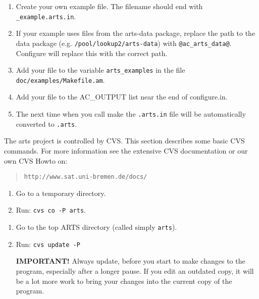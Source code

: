 \begin{enumerate}
\item Create your own example file. The filename should end with
  \verb|_example.arts.in|.
\item If your example uses files from the arts-data package, replace
  the path to the data package (e.g. \verb|/pool/lookup2/arts-data|)
  with \verb|@ac_arts_data@|. Configure will replace this with the
  correct path.
\item Add your file to the variable \verb|arts_examples| in the file
  \verb|doc/examples/Makefile.am|.
\item Add your file to the AC\_OUTPUT list near the end of configure.in.
\item The next time when you call make the \verb|.arts.in| file will
  be automatically converted to \verb|.arts|.
\end{enumerate}


 \label{sec:development:cvs}

The arts project is controlled by CVS. This section describes some
basic CVS commands. For more information see the extensive CVS
documentation or our own CVS Howto on:
\begin{quote}
  \verb|http://www.sat.uni-bremen.de/docs/|
\end{quote}




\begin{enumerate}
\item Go to a temporary directory.
\item Run: \verb|cvs co -P arts|.
\end{enumerate}


\begin{enumerate}
\item Go to the top ARTS directory (called simply \verb|arts|).
\item Run: \verb|cvs update -P|
   
  \textbf{IMPORTANT!} Always update, before you start to make changes
  to the program, especially after a longer pause. If you edit an
  outdated copy, it will be a lot more work to bring your changes into
  the current copy of the program.
\end{enumerate}


